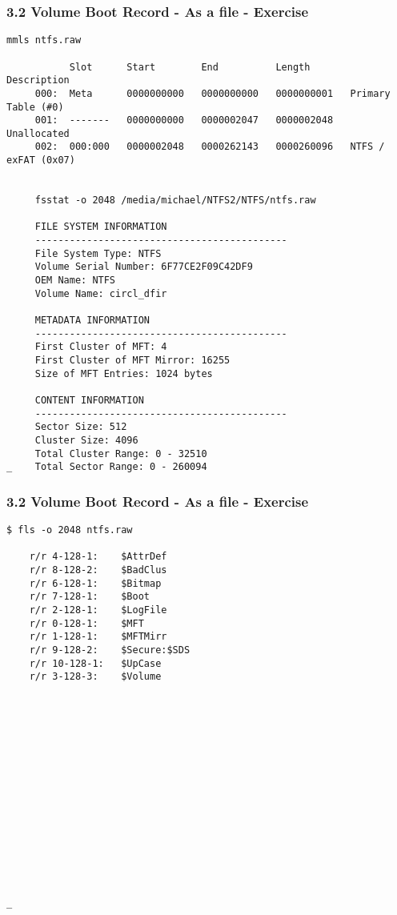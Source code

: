 \begin{frame}[fragile]
  \frametitle{3.2 Volume Boot Record - As a file - Exercise}
  \begin{lstlisting}[basicstyle=\tiny]
     mmls ntfs.raw 

           Slot      Start        End          Length       Description
     000:  Meta      0000000000   0000000000   0000000001   Primary Table (#0)
     001:  -------   0000000000   0000002047   0000002048   Unallocated
     002:  000:000   0000002048   0000262143   0000260096   NTFS / exFAT (0x07)


     fsstat -o 2048 /media/michael/NTFS2/NTFS/ntfs.raw 

     FILE SYSTEM INFORMATION
     --------------------------------------------
     File System Type: NTFS
     Volume Serial Number: 6F77CE2F09C42DF9
     OEM Name: NTFS    
     Volume Name: circl_dfir

     METADATA INFORMATION
     --------------------------------------------
     First Cluster of MFT: 4
     First Cluster of MFT Mirror: 16255
     Size of MFT Entries: 1024 bytes

     CONTENT INFORMATION
     --------------------------------------------
     Sector Size: 512
     Cluster Size: 4096
     Total Cluster Range: 0 - 32510
_    Total Sector Range: 0 - 260094
  \end{lstlisting}
\end{frame}


\begin{frame}[fragile]
  \frametitle{3.2 Volume Boot Record - As a file - Exercise}
  \begin{lstlisting}[basicstyle=\tiny]
  $ fls -o 2048 ntfs.raw

	r/r 4-128-1:	$AttrDef
	r/r 8-128-2:	$BadClus
	r/r 6-128-1:	$Bitmap
	r/r 7-128-1:	$Boot
	r/r 2-128-1:	$LogFile
	r/r 0-128-1:	$MFT
	r/r 1-128-1:	$MFTMirr
	r/r 9-128-2:	$Secure:$SDS
	r/r 10-128-1:	$UpCase
	r/r 3-128-3:	$Volume
















_ 
  \end{lstlisting}
\end{frame}


